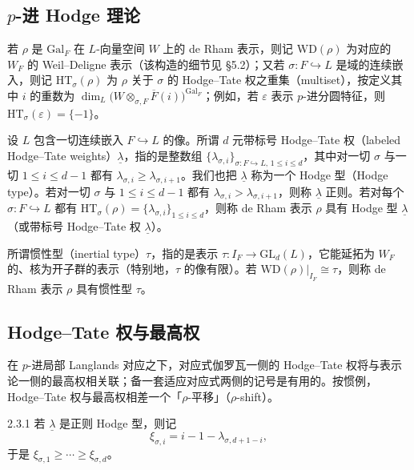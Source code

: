 \subsection{$p$-进 Hodge 理论}

若 $\rho$ 是 $\mathrm{Gal}_F$ 在 $L$-向量空间 $W$ 上的 de Rham 表示，则记 $\mathrm{WD}(\rho)$ 为对应的 $W_F$ 的 Weil--Deligne 表示（该构造的细节见 §5.2）；又若 $\sigma:F\hookrightarrow L$ 是域的连续嵌入，则记 $\mathrm{HT}_\sigma(\rho)$ 为 $\rho$ 关于 $\sigma$ 的 Hodge--Tate 权之重集（multiset），按定义其中 $i$ 的重数为 $\dim_L\bigl(W\otimes_{\sigma,F}\overline{F}(i)\bigr)^{\mathrm{Gal}_F}$；例如，若 $\varepsilon$ 表示 $p$-进分圆特征，则 $\mathrm{HT}_\sigma(\varepsilon)=\{-1\}$。

设 $L$ 包含一切连续嵌入 $F\hookrightarrow L$ 的像。所谓 $d$ 元带标号 Hodge--Tate 权（labeled Hodge--Tate weights）$\underline{\lambda}$，指的是整数组 $\{\lambda_{\sigma,i}\}_{\sigma:F\hookrightarrow L,\,1\le i\le d}$，其中对一切 $\sigma$ 与一切 $1\le i\le d-1$ 都有 $\lambda_{\sigma,i}\ge\lambda_{\sigma,i+1}$。我们也把 $\underline{\lambda}$ 称为一个 Hodge 型（Hodge type）。若对一切 $\sigma$ 与 $1\le i\le d-1$ 都有 $\lambda_{\sigma,i}>\lambda_{\sigma,i+1}$，则称 $\underline{\lambda}$ 正则。若对每个 $\sigma:F\hookrightarrow L$ 都有 $\mathrm{HT}_\sigma(\rho)=\{\lambda_{\sigma,i}\}_{1\le i\le d}$，则称 de Rham 表示 $\rho$ 具有 Hodge 型 $\underline{\lambda}$（或带标号 Hodge--Tate 权 $\underline{\lambda}$）。

所谓惯性型（inertial type）$\tau$，指的是表示 $\tau:I_F\to\mathrm{GL}_d(L)$，它能延拓为 $W_F$ 的、核为开子群的表示（特别地，$\tau$ 的像有限）。若 $\mathrm{WD}(\rho)|_{I_F}\cong\tau$，则称 de Rham 表示 $\rho$ 具有惯性型 $\tau$。

\subsection{Hodge--Tate 权与最高权}

在 $p$-进局部 Langlands 对应之下，对应式伽罗瓦一侧的 Hodge--Tate 权将与表示论一侧的最高权相关联；备一套适应对应式两侧的记号是有用的。按惯例，Hodge--Tate 权与最高权相差一个「$\rho$-平移」（$\rho$-shift）。

\begin{defn}{2.3.1}\label{defn:a4-2-3-1}
若 $\underline{\lambda}$ 是正则 Hodge 型，则记
\[
\xi_{\sigma,i}=i-1-\lambda_{\sigma,d+1-i},
\]
于是 $\xi_{\sigma,1}\ge\cdots\ge\xi_{\sigma,d}$。
\end{defn}


